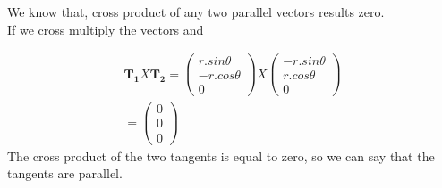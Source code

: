 \documentclass[journal,12pt,twocolumn]{article}
\let\vec\mathbf
\newcommand{\myvec}[1]{\ensuremath{\begin{pmatrix}#1\end{pmatrix}}}
\begin{document}
We know that, cross product of any two parallel vectors results zero.\\

If we cross multiply the vectors  and 

\begin{eqnarray}
	\vec{T_1} X \vec{T_2}
	= \myvec{r.sin\theta \\ -r.cos\theta \\ 0} X \myvec{-r.sin\theta \\r.cos\theta \\0}\\
	= \myvec{0\\0\\0}
\end{eqnarray}
The cross product of the two tangents is equal to zero, so we can say that the tangents are parallel.
\end{document}
